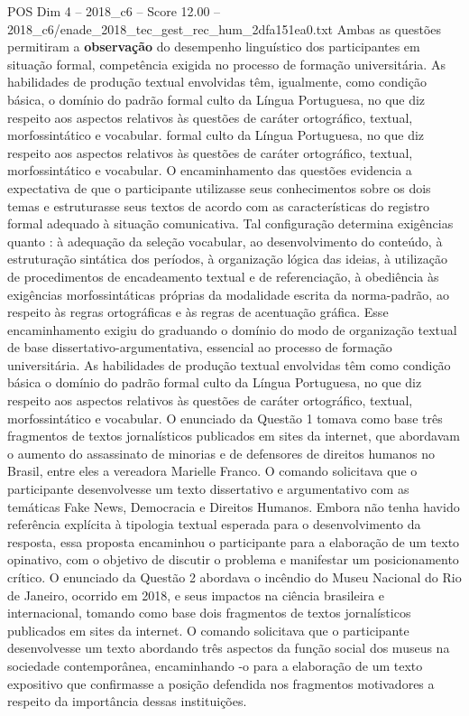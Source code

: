 \begin{textsample}{POS Dim 4 – 2018\_c6 – Score 12.00 – 2018\_c6/enade\_2018\_tec\_gest\_rec\_hum\_2dfa151ea0.txt}
Ambas as questões permitiram a \textbf{observação} do desempenho linguístico dos participantes em situação formal, competência exigida no processo de formação universitária.
As habilidades de produção textual envolvidas têm, igualmente, como condição básica, o domínio do padrão formal culto da Língua Portuguesa, no que diz respeito aos aspectos relativos às questões de caráter ortográfico, textual, morfossintático e vocabular. formal culto da Língua Portuguesa, no que diz respeito aos aspectos relativos às questões de caráter ortográfico, textual, morfossintático e vocabular.
O encaminhamento das questões evidencia a expectativa de que o participante utilizasse seus conhecimentos sobre os dois temas e estruturasse seus textos de acordo com as características do registro formal adequado à situação comunicativa.
Tal configuração determina exigências quanto : à adequação da seleção vocabular, ao desenvolvimento do conteúdo, à estruturação sintática dos períodos, à organização lógica das ideias, à utilização de procedimentos de encadeamento textual e de referenciação, à obediência às exigências morfossintáticas próprias da modalidade escrita da norma-padrão, ao respeito às regras ortográficas e às regras de acentuação gráfica.
Esse encaminhamento exigiu do graduando o domínio do modo de organização textual de base dissertativo-argumentativa, essencial ao processo de formação universitária.
As habilidades de produção textual envolvidas têm como condição básica o domínio do padrão formal culto da Língua Portuguesa, no que diz respeito aos aspectos relativos às questões de caráter ortográfico, textual, morfossintático e vocabular.
O enunciado da Questão 1 tomava como base três fragmentos de textos jornalísticos publicados em sites da internet, que abordavam o aumento do assassinato de minorias e de defensores de direitos humanos no Brasil, entre eles a vereadora Marielle Franco.
O comando solicitava que o participante desenvolvesse um texto dissertativo e argumentativo com as temáticas Fake News, Democracia e Direitos Humanos.
Embora não tenha havido referência explícita à tipologia textual esperada para o desenvolvimento da resposta, essa proposta encaminhou o participante para a elaboração de um texto opinativo, com o objetivo de discutir o problema e manifestar um posicionamento crítico.
O enunciado da Questão 2 abordava o incêndio do Museu Nacional do Rio de Janeiro, ocorrido em 2018, e seus impactos na ciência brasileira e internacional, tomando como base dois fragmentos de textos jornalísticos publicados em sites da internet.
O comando solicitava que o participante desenvolvesse um texto abordando três aspectos da função social dos museus na sociedade contemporânea, encaminhando -o para a elaboração de um texto expositivo que confirmasse a posição defendida nos fragmentos motivadores a respeito da importância dessas instituições.

\end{textsample}
